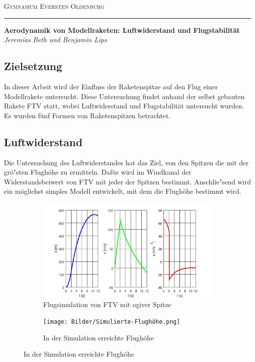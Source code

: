 \documentclass[11pt,a4paper]{article}
\begin{document}
\thispagestyle{empty}

{\scshape\large\centering Gymnasium Eversten Oldenburg \\}
\vspace{-10pt}
\noindent\rule{\textwidth}{0.5pt} %
\vspace{5pt}
{\large\bfseries\centering Aerodynamik von Modellraketen: Luftwiderstand und Flugstabilität \\}
{\centering\itshape Jeremias Beth und Benjamin Lips \\}

\vspace{-5pt}
\subsection*{Zielsetzung}
\vspace{-10pt}

In dieser Arbeit wird der Einfluss der Raketenspitze auf den Flug einer Modellrakete untersucht. Diese Untersuchung findet anhand der selbst gebauten Rakete FTV statt, wobei Luftwiderstand und Flugstabilität untersucht wurden. Es wurden fünf Formen von Raketenspitzen betrachtet.


\vspace{-5pt}
\subsection*{Luftwiderstand}
\vspace{-10pt}

Die Untersuchung des Luftwiderstandes hat das Ziel, von den Spitzen die mit der grö"sten Flughöhe zu ermitteln. Dafür wird im Windkanal der Widerstandsbeiwert von FTV mit jeder der Spitzen bestimmt. Anschlie"send wird ein möglichst simples Modell entwickelt, mit dem die Flughöhe bestimmt wird. 

\begin{figure}[H]
	\begin{subfigure}[l]{0.49\textwidth}
		\centering
		\includegraphics[width=\textwidth]{Bilder/Flugsimulation.png}
		\caption{Flugsimulation von FTV mit ogiver Spitze}
		\label{sfig-Flugsimulation}
	\end{subfigure}
	\begin{subfigure}[r]{0.49\textwidth}
		\centering
		\texttt{[image: Bilder/Simulierte-Flughöhe.png]}
		\caption{In der Simulation erreichte Flughöhe}
		\label{sfig-Simulierte-Flughöhe}
	\end{subfigure}
\end{figure}
\end{document}
